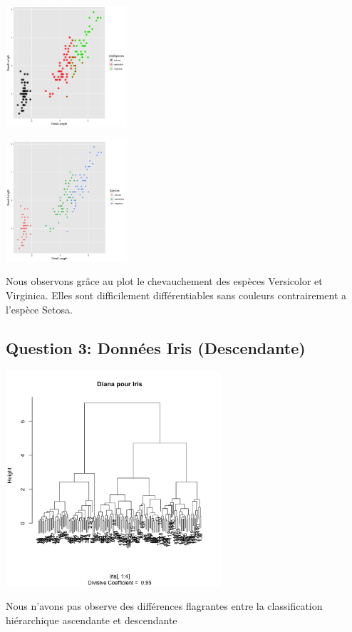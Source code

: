 \documentclass[10pt]{article}
\begin{document}
	\begin{minipage}{.5\textwidth}
	\includegraphics[width = 45mm]{Figures/HClust/ggplot_Iris_ward.png}
	\label{fig:iris_ward_ggplot}
	\end{minipage}%
	\hspace{0.02\linewidth}
	\begin{minipage}{.5\textwidth}
	\includegraphics[width = 45mm]{Figures/HClust/ggplot_Iris_normal.png}
	\label{fig:iris_normal_ggplot}
	\end{minipage}
	\newline
	
	Nous observons grâce au plot le chevauchement des espèces Versicolor et Virginica. Elles sont difficilement différentiables sans couleurs contrairement a l'espèce Setosa.
	
	\subsection{Question 3: Données Iris (Descendante)}
	\begin{center}
		\includegraphics[height = 8cm, width = 8cm]{Figures/HClust/diana_Iris.png}
		\label{fig:iris_diana}
	\end{center}
	Nous n'avons pas observe des différences flagrantes entre la classification hiérarchique ascendante et descendante
	
\end{document}
